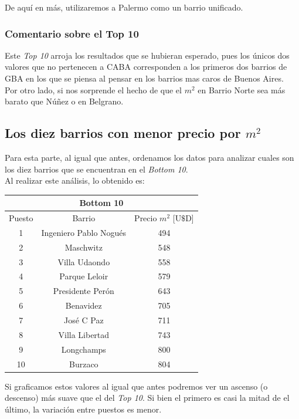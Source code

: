 \documentclass[a4paper, 10pt]{article}
\newcommand\tab[1][0.5cm]{\hspace*{#1}}
\begin{document}
			  		\tab De aquí en más, utilizaremos a Palermo como un barrio unificado.
			  	\subsubsection{Comentario sobre el Top 10}
				  	Este \emph{Top 10} arroja los resultados que se hubieran esperado, pues los únicos dos valores que no pertenecen
			  	a CABA corresponden a los primeros dos barrios de GBA en los que se piensa al pensar en los barrios mas caros
			  	de Buenos Aires. \\
			  		\tab Por otro lado, si nos sorprende el hecho de que el $m^2$ en Barrio Norte sea más barato que Núñez o en
			  		Belgrano.
			\subsection{Los diez barrios con menor precio por $m^2$}
				Para esta parte, al igual que antes, ordenamos los datos para analizar cuales son los diez barrios que se encuentran
				en el \emph{Bottom 10}. \\
				\tab Al realizar este análisis, lo obtenido es:
				\begin{center}
					\begin{tabular}{ |c|c|c| }
						\hline
						\multicolumn{3}{|c|}{Bottom 10}\\
						\hline
						\hline
						Puesto & Barrio & Precio $m^2$ [U$\$$D] \\
						\hline
						1 & Ingeniero Pablo Nogués & 494 \\
						2 & Maschwitz & 548 \\
						3 & Villa Udaondo & 558 \\
						4 & Parque Leloir & 579 \\
						5 & Presidente Perón & 643 \\
						6 & Benavidez & 705 \\
						7 & José C Paz & 711 \\
						8 & Villa Libertad & 743 \\
						9 & Longchamps & 800 \\
						10 & Burzaco & 804 \\
						\hline
					\end{tabular}
				\end{center}
				\tab Si graficamos estos valores al igual que antes podremos ver un ascenso (o descenso) más suave que el del
				\emph{Top 10}. Si bien el primero es casi la mitad de el último, la variación entre puestos es menor. \\
\end{document}
